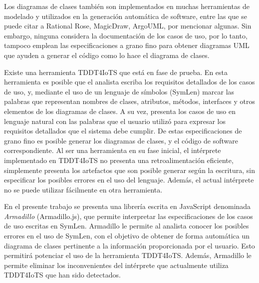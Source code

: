 Los diagramas de clases también son implementados en muchas herramientas de modelado y utilizados en la generación automática de software, entre las que se puede citar a Rational Rose, MagicDraw, ArgoUML, por mencionar algunas. Sin embargo, ninguna considera la documentación de los casos de uso, por lo tanto, tampoco emplean las especificaciones a grano fino para obtener diagramas UML que ayuden a generar el código como lo hace el diagrama de clases.

Existe una herramienta TDDT4IoTS \parencite{tddt4iots} que está en fase de prueba. En esta herramienta es posible que el analista escriba los requisitos detallados de los casos de uso, y, mediante el uso de un lenguaje de símbolos (SymLen) marcar las palabras que representan nombres de clases, atributos, métodos, interfaces y otros elementos de los diagramas de clases. A su vez, presenta los casos de uso en lenguaje natural con las palabras que el usuario utilizó para expresar los requisitos detallados que el sistema debe cumplir. De estas especificaciones de grano fino es posible generar los diagramas de clases, y el código de software correspondiente. Al ser una herramienta en su fase inicial, el intérprete implementado en TDDT4IoTS no presenta una retroalimentación eficiente, simplemente presenta los artefactos que son posible generar según la escritura, sin especificar los posibles errores en el uso del lenguaje. Además, el actual intérprete no se puede utilizar fácilmente en otra herramienta.

En el presente trabajo se presenta una librería escrita en JavaScript denominada \textit{Armadillo} (Armadillo.js), que permite interpretar las especificaciones de los casos de uso escritas en SymLen. Armadillo le permite al analista conocer los posibles errores en el uso de SymLen, con el objetivo de obtener de forma automática un diagrama de clases pertinente a la información proporcionada por el usuario. Esto permitirá potenciar el uso de la herramienta TDDT4IoTS. Además, Armadillo le permite eliminar los inconvenientes del intérprete que actualmente utiliza TDDT4IoTS que han sido detectados.

\newpage

